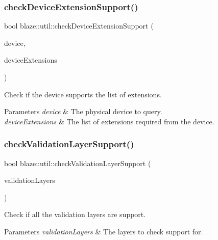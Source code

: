 \subsubsection{\texorpdfstring{check\+Device\+Extension\+Support()}{checkDeviceExtensionSupport()}}
{\footnotesize\ttfamily bool blaze\+::util\+::check\+Device\+Extension\+Support (\begin{DoxyParamCaption}\item[{Vk\+Physical\+Device}]{device,  }\item[{const std\+::vector$<$ const char $\ast$ $>$ \&}]{device\+Extensions }\end{DoxyParamCaption})}



Check if the device supports the list of extensions. 


\begin{DoxyParams}{Parameters}
{\em device} & The physical device to query. \\
\hline
{\em device\+Extensions} & The list of extensions required from the device. \\
\hline
\end{DoxyParams}
\mbox{\label{namespaceblaze_1_1util_a84a8343ca8455d39e1d2cfacf1c23ac2}} 
\subsubsection{\texorpdfstring{check\+Validation\+Layer\+Support()}{checkValidationLayerSupport()}}
{\footnotesize\ttfamily bool blaze\+::util\+::check\+Validation\+Layer\+Support (\begin{DoxyParamCaption}\item[{const std\+::vector$<$ const char $\ast$ $>$ \&}]{validation\+Layers }\end{DoxyParamCaption})}



Check if all the validation layers are support. 


\begin{DoxyParams}{Parameters}
{\em validation\+Layers} & The layers to check support for. \\
\hline
\end{DoxyParams}
\mbox{\label{namespaceblaze_1_1util_aaed1ad5722a1038338250760d95d5b48}} 
